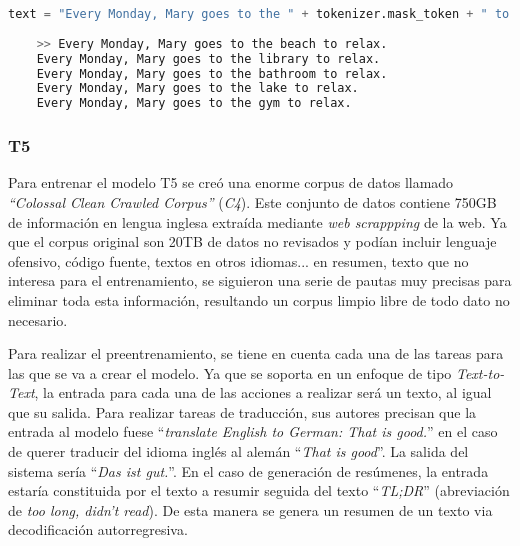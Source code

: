 \begin{lstlisting}[language=Python, caption=Ejemplo de predicción de una palabra enmascarada en una secuencia, label={lst:model-bert}]
	text = "Every Monday, Mary goes to the " + tokenizer.mask_token + " to relax."
	
	>> Every Monday, Mary goes to the beach to relax.
	Every Monday, Mary goes to the library to relax.
	Every Monday, Mary goes to the bathroom to relax.
	Every Monday, Mary goes to the lake to relax.
	Every Monday, Mary goes to the gym to relax.
\end{lstlisting} 


\subsubsection{T5}


Para entrenar el modelo T5 se creó una enorme corpus de datos llamado \textit{``Colossal Clean Crawled Corpus''} (\textit{C4}). Este conjunto de datos contiene 750GB de información en lengua inglesa extraída mediante \textit{web scrappping} de la web. Ya que el corpus original son 20TB de datos no revisados y podían incluir lenguaje ofensivo, código fuente, textos en otros idiomas... en resumen, texto que no interesa para el entrenamiento, se siguieron una serie de pautas muy precisas para eliminar toda esta información, resultando un corpus limpio libre de todo dato no necesario.

Para realizar el preentrenamiento, se tiene en cuenta cada una de las tareas para las que se va a crear el modelo. Ya que se soporta en un enfoque de tipo \textit{Text-to-Text}, la entrada para cada una de las acciones a realizar será un texto, al igual que su salida. Para realizar tareas de traducción, sus autores precisan que la entrada al modelo fuese ``\textit{translate English to German: That is
	good.}'' en el caso de querer traducir del idioma inglés al alemán ``\textit{That is
	good}''. La salida del sistema sería ``\textit{Das ist gut.}''. En el caso de generación de resúmenes, la entrada estaría constituida por el texto a resumir seguida del texto ``\textit{TL;DR}'' (abreviación de \textit{too long, didn't read}). De esta manera se genera un resumen de un texto via decodificación autorregresiva. 

